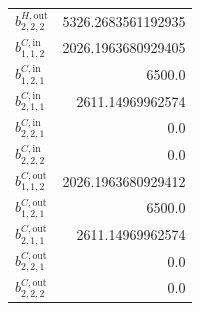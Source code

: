 \documentclass{article}%
\begin{document}
\begin{multicols*}{3}
\begin{supertabular}{lr}
	$b_{2,2,2}^{H,\text{out}}$ & 5326.2683561192935 \\%
	$b_{1,1,2}^{C,\text{in}}$ & 2026.1963680929405 \\%
	$b_{1,2,1}^{C,\text{in}}$ & 6500.0 \\%
	$b_{2,1,1}^{C,\text{in}}$ & 2611.14969962574 \\%
	$b_{2,2,1}^{C,\text{in}}$ & 0.0 \\%
	$b_{2,2,2}^{C,\text{in}}$ & 0.0 \\%
	$b_{1,1,2}^{C,\text{out}}$ & 2026.1963680929412 \\%
	$b_{1,2,1}^{C,\text{out}}$ & 6500.0 \\%
	$b_{2,1,1}^{C,\text{out}}$ & 2611.14969962574 \\%
	$b_{2,2,1}^{C,\text{out}}$ & 0.0 \\%
	$b_{2,2,2}^{C,\text{out}}$ & 0.0 \\%
\end{supertabular}%
\end{multicols*}%
\end{document}
